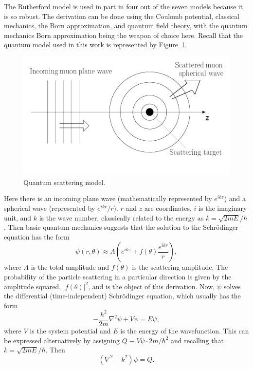 The Rutherford model is used in part in four out of the seven models because it is so robust. The derivation can be done using the Coulomb potential, classical mechanics, the Born approximation, and quantum field theory, with the quantum mechanics Born approximation being the weapon of choice here. Recall that the quantum model used in this work is represented by Figure~\ref{fig:qmscatteringmodel}.
\begin{figure}
  \centering
    \includegraphics[width=\textwidth]{Figures/scattering_model_2} 
  \caption{Quantum scattering model.}
  \label{fig:qmscatteringmodel}
\end{figure}
Here there is an incoming plane wave (mathematically represented by $e^{ikz}$) and a spherical wave (represented by $e^{ikr}/r$). $r$ and $z$ are coordinates, $i$ is the imaginary unit, and $k$ is the wave number, classically related to the energy as $k=\sqrt{2mE}/\hbar$. Then basic quantum mechanics suggests that the solution to the Schr\"{o}dinger equation has the form
\begin{equation}
\label{eqn:scatteringwavefunction}
\psi (r,\theta)\approx A \left(e^{ikz}+f(\theta)\frac{e^{ikr}}{r}\right),
\end{equation}
where $A$ is the total amplitude and $f(\theta)$ is the scattering amplitude. The probability of the particle scattering in a particular direction is given by the amplitude squared, $|f(\theta)|^2$, and is the object of this derivation. Now, $\psi$ solves the differential (time-independent) Schr\"{o}dinger equation, which usually has the form
\begin{equation} \nonumber
-\frac{\hbar^2}{2m}\nabla^2\psi+V\psi=E\psi,
\end{equation}
where $V$ is the system potential and $E$ is the energy of the wavefunction. This can be expressed alternatively by assigning $Q\equiv V\psi\cdot{2m}/{\hbar^2}$ and recalling that $k=\sqrt{2mE}/\hbar$. Then
%
\begin{equation}
\label{eqn:schrodinger}
(\nabla^2+k^2)\psi=Q.
\end{equation}


